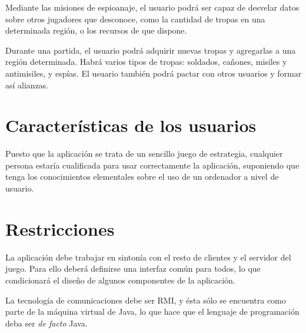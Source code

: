 Mediante las misiones de espioanaje, el usuario podrá ser capaz de desvelar
datos sobre otros jugadores que desconoce, como la cantidad de tropas en una
determinada región, o los recursos de que dispone.

Durante una partida, el usuario podrá adquirir nuevas tropas y agregarlas a una
región determinada. Habrá varios tipos de tropas: soldados, cañones, misiles y
antimisiles, y espías. El usuario también podrá pactar con otros usuarios y
formar así alianzas.

\section{Características de los usuarios}

Puesto que la aplicación se trata de un sencillo juego de estrategia, cualquier
persona estaría cualificada para usar correctamente la aplicación, suponiendo
que tenga los conocimientos elementales sobre el uso de un ordenador a nivel de
usuario.

\section{Restricciones}

La aplicación debe trabajar en sintonía con el resto de clientes y el servidor
del juego. Para ello deberá definirse una interfaz común para todos, lo que
condicionará el diseño de algunos componentes de la aplicación.

La tecnología de comunicaciones debe ser RMI, y ésta sólo se encuentra como
parte de la máquina virtual de Java, lo que hace que el lenguaje de programación
deba ser \textit{de facto} Java.
